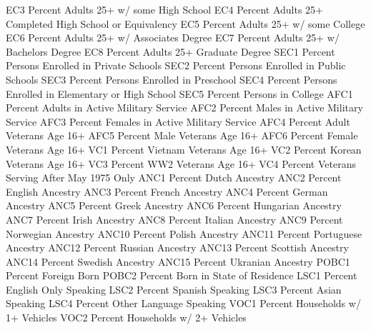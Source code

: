 \documentclass[
  11pt,
  a4paper,
  DIV=12,captions=tableheading,oneside,titlepage]{scrbook}
\let\oldverbatim\verbatim
\let\endoldverbatim\endverbatim
\renewenvironment{verbatim}{\footnotesize\oldverbatim}{\endoldverbatim}
\begin{document}
\begin{verbatim}
EC3                         Percent Adults 25+ w/ some High School
EC4                         Percent Adults 25+ Completed High School or Equivalency
EC5                         Percent Adults 25+ w/ some College
EC6                         Percent Adults 25+ w/ Associates Degree
EC7                         Percent Adults 25+ w/ Bachelors Degree
EC8                         Percent Adults 25+ Graduate Degree
SEC1                        Percent Persons Enrolled in Private Schools
SEC2                        Percent Persons Enrolled in Public Schools
SEC3                        Percent Persons Enrolled in Preschool
SEC4                        Percent Persons Enrolled in Elementary or High School
SEC5                        Percent Persons in College
AFC1                        Percent Adults in Active Military Service
AFC2                        Percent Males in Active Military Service
AFC3                        Percent Females in Active Military Service
AFC4                        Percent Adult Veterans Age 16+
AFC5                        Percent Male Veterans Age 16+
AFC6                        Percent Female Veterans Age 16+
VC1                         Percent Vietnam Veterans Age 16+
VC2                         Percent Korean Veterans Age 16+
VC3                         Percent WW2 Veterans Age 16+
VC4                         Percent Veterans Serving After May 1975 Only
ANC1                        Percent Dutch Ancestry
ANC2                        Percent English Ancestry
ANC3                        Percent French Ancestry
ANC4                        Percent German Ancestry
ANC5                        Percent Greek Ancestry
ANC6                        Percent Hungarian Ancestry
ANC7                        Percent Irish Ancestry
ANC8                        Percent Italian Ancestry
ANC9                        Percent Norwegian Ancestry
ANC10                       Percent Polish Ancestry
ANC11                       Percent Portuguese Ancestry
ANC12                       Percent Russian Ancestry
ANC13                       Percent Scottish Ancestry
ANC14                       Percent Swedish Ancestry
ANC15                       Percent Ukranian Ancestry
POBC1                       Percent Foreign Born
POBC2                       Percent Born in State of Residence
LSC1                        Percent English Only Speaking
LSC2                        Percent Spanish Speaking
LSC3                        Percent Asian Speaking
LSC4                        Percent Other Language Speaking
VOC1                        Percent Households w/ 1+ Vehicles
VOC2                        Percent Households w/ 2+ Vehicles

\end{verbatim}
\end{document}
